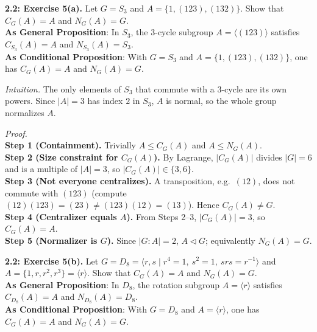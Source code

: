 \documentclass[12pt]{article}
\theoremstyle{definition}
\begin{document}
\newpage

\newpage

\noindent \textbf{2.2: Exercise 5(a).} Let $G=S_3$ and $A=\{1,(123),(132)\}$. Show that $C_G(A)=A$ and $N_G(A)=G$.\\ %

\noindent\textbf{As General Proposition}: In $S_3$, the $3$-cycle subgroup $A=\langle (123)\rangle$ satisfies $C_{S_3}(A)=A$ and $N_{S_3}(A)=S_3$.\\

\noindent \textbf{As Conditional Proposition}: With $G=S_3$ and $A=\{1,(123),(132)\}$, one has $C_G(A)=A$ and $N_G(A)=G$.

\newpage

\dotfill

\emph{Intuition.} The only elements of $S_3$ that commute with a $3$-cycle are its own powers. Since $|A|=3$ has index $2$ in $S_3$, $A$ is normal, so the whole group normalizes $A$.\\

\dotfill

\emph{Proof.}\\
\textbf{Step 1 (Containment).} Trivially $A\le C_G(A)$ and $A\le N_G(A)$.\\
\textbf{Step 2 (Size constraint for $C_G(A)$).} By Lagrange, $|C_G(A)|$ divides $|G|=6$ and is a multiple of $|A|=3$, so $|C_G(A)|\in\{3,6\}$.\\
\textbf{Step 3 (Not everyone centralizes).} A transposition, e.g.\ $(12)$, does not commute with $(123)$ (compute $(12)(123)=(23)\neq(123)(12)=(13)$). Hence $C_G(A)\neq G$.\\
\textbf{Step 4 (Centralizer equals $A$).} From Steps 2–3, $|C_G(A)|=3$, so $C_G(A)=A$.\\
\textbf{Step 5 (Normalizer is $G$).} Since $|G:A|=2$, $A\lhd G$; equivalently $N_G(A)=G$.\\

\newpage



\noindent \textbf{2.2: Exercise 5(b).} Let $G=D_8=\langle r,s\mid r^4=1,\ s^2=1,\ srs=r^{-1}\rangle$ and $A=\{1,r,r^2,r^3\}=\langle r\rangle$. Show that $C_G(A)=A$ and $N_G(A)=G$.\\ %

\noindent\textbf{As General Proposition}: In $D_8$, the rotation subgroup $A=\langle r\rangle$ satisfies $C_{D_8}(A)=A$ and $N_{D_8}(A)=D_8$.\\

\noindent \textbf{As Conditional Proposition}: With $G=D_8$ and $A=\langle r\rangle$, one has $C_G(A)=A$ and $N_G(A)=G$.
\end{document}
